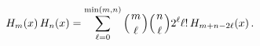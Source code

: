 \[\mathop{H_{m}\/}\nolimits\!\left(x\right)\mathop{H_{n}\/}\nolimits\!\left(x%
\right)=\sum_{\ell=0}^{\min(m,n)}{\left({{m}\atop{\ell}}\right)}{\left({{n}%
\atop{\ell}}\right)}2^{\ell}\ell!\mathop{H_{m+n-2\ell}\/}\nolimits\!\left(x%
\right).\]